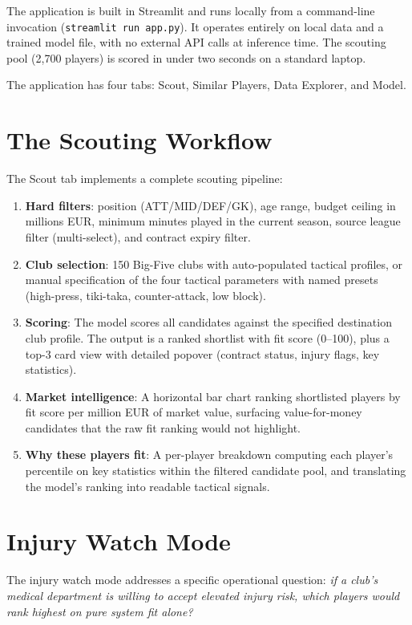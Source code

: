 \documentclass[12pt, a4paper, oneside]{report}
\begin{document}
The application is built in Streamlit and runs locally from a command-line invocation (\texttt{streamlit run app.py}). It operates entirely on local data and a trained model file, with no external API calls at inference time. The scouting pool (2,700 players) is scored in under two seconds on a standard laptop.

The application has four tabs: Scout, Similar Players, Data Explorer, and Model.

\section{The Scouting Workflow}

The Scout tab implements a complete scouting pipeline:

\begin{enumerate}[leftmargin=2em]
\item \textbf{Hard filters}: position (ATT/MID/DEF/GK), age range, budget ceiling in millions EUR, minimum minutes played in the current season, source league filter (multi-select), and contract expiry filter.
\item \textbf{Club selection}: 150 Big-Five clubs with auto-populated tactical profiles, or manual specification of the four tactical parameters with named presets (high-press, tiki-taka, counter-attack, low block).
\item \textbf{Scoring}: The model scores all candidates against the specified destination club profile. The output is a ranked shortlist with fit score (0--100), plus a top-3 card view with detailed popover (contract status, injury flags, key statistics).
\item \textbf{Market intelligence}: A horizontal bar chart ranking shortlisted players by fit score per million EUR of market value, surfacing value-for-money candidates that the raw fit ranking would not highlight.
\item \textbf{Why these players fit}: A per-player breakdown computing each player's percentile on key statistics within the filtered candidate pool, and translating the model's ranking into readable tactical signals.
\end{enumerate}

\section{Injury Watch Mode}

The injury watch mode addresses a specific operational question: \textit{if a club's medical department is willing to accept elevated injury risk, which players would rank highest on pure system fit alone?}
\end{document}
